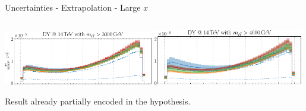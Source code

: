 \documentclass[9pt]{beamer}
\begin{document}
\begin{frame}{Uncertainties - Extrapolation - Large $x$}
    \begin{columns}
        \begin{column}{0.5\textwidth}
            \begin{tcolorbox}[size=small,sharpish corners,boxrule=0mm]
                \centering
                \includegraphics[width=0.49\textwidth]{NNPDF_DY_14TEV_BSM_AFB_COS_3000}
                \includegraphics[width=0.49\textwidth]{NNPDF_DY_14TEV_BSM_AFB_COS_4000}
            \end{tcolorbox}

            \vspace*{20pt}
            Result already partially encoded in the hypothesis.
            \vspace*{20pt}


\end{column}
\end{columns}
\end{frame}
\end{document}
